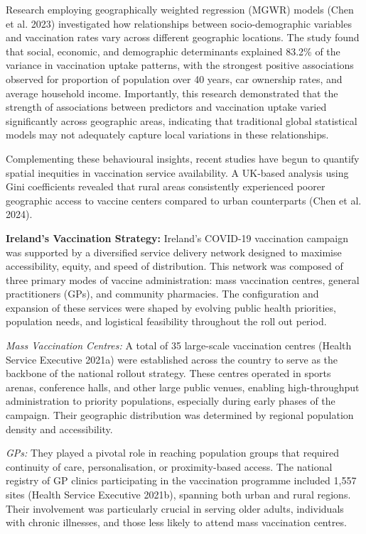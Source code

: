 \documentclass{article}
\begin{document}
Research employing geographically weighted regression (MGWR) models
(Chen et al. 2023) investigated how relationships between
socio-demographic variables and vaccination rates vary across different
geographic locations. The study found that social, economic, and
demographic determinants explained 83.2\% of the variance in vaccination
uptake patterns, with the strongest positive associations observed for
proportion of population over 40 years, car ownership rates, and average
household income. Importantly, this research demonstrated that the
strength of associations between predictors and vaccination uptake
varied significantly across geographic areas, indicating that
traditional global statistical models may not adequately capture local
variations in these relationships.

Complementing these behavioural insights, recent studies have begun to
quantify spatial inequities in vaccination service availability. A
UK-based analysis using Gini coefficients revealed that rural areas
consistently experienced poorer geographic access to vaccine centers
compared to urban counterparts (Chen et al. 2024).

\textbf{Ireland's Vaccination Strategy:} Ireland's COVID-19 vaccination
campaign was supported by a diversified service delivery network
designed to maximise accessibility, equity, and speed of distribution.
This network was composed of three primary modes of vaccine
administration: mass vaccination centres, general practitioners (GPs),
and community pharmacies. The configuration and expansion of these
services were shaped by evolving public health priorities, population
needs, and logistical feasibility throughout the roll out period.

\emph{Mass Vaccination Centres:} A total of 35 large-scale vaccination
centres (Health Service Executive 2021a) were established across the
country to serve as the backbone of the national rollout strategy. These
centres operated in sports arenas, conference halls, and other large
public venues, enabling high-throughput administration to priority
populations, especially during early phases of the campaign. Their
geographic distribution was determined by regional population density
and accessibility.

\emph{GPs:} They played a pivotal role in reaching population groups
that required continuity of care, personalisation, or proximity-based
access. The national registry of GP clinics participating in the
vaccination programme included 1,557 sites (Health Service Executive
2021b), spanning both urban and rural regions. Their involvement was
particularly crucial in serving older adults, individuals with chronic
illnesses, and those less likely to attend mass vaccination centres.
\end{document}
